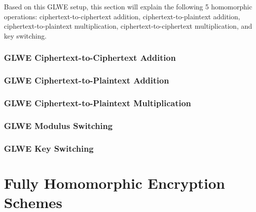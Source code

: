 \documentclass[11pt]{article}
\begin{document}
Based on this GLWE setup, this section will explain the following 5 homomorphic operations: ciphertext-to-ciphertext addition, ciphertext-to-plaintext addition, ciphertext-to-plaintext multiplication, ciphertext-to-ciphertext multiplication, and key switching. 


\clearpage


\section{GLWE Ciphertext-to-Ciphertext Addition}
\label{sec:glwe-add-cipher}


\clearpage

\section{GLWE Ciphertext-to-Plaintext Addition}
\label{sec:glwe-add-plain}


\clearpage

\section{GLWE Ciphertext-to-Plaintext Multiplication}
\label{sec:glwe-mult-plain}


\clearpage

\section{GLWE Modulus Switching}
\label{sec:modulus-switching}


\clearpage


\section{GLWE Key Switching}
\label{sec:glwe-key-switching}




\clearpage


%


\part{Fully Homomorphic Encryption Schemes}
\label{part:fhe-schemes}
\end{document}
